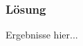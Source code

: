 \begin{frame} %
  \frametitle{Lösung} %
  \begin{definition} %
    Ergebnisse hier...
  \end{definition}
\end{frame}